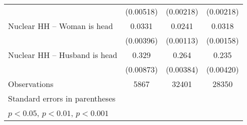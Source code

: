 {\begin{tabular}{l*{3}{c}}
                    &   (0.00518)         &   (0.00218)         &   (0.00218)         \\
\addlinespace
Nuclear HH – Woman is head&      0.0331\sym{***}&      0.0241\sym{***}&      0.0318\sym{***}\\
                    &   (0.00396)         &   (0.00113)         &   (0.00158)         \\
\addlinespace
Nuclear HH – Husband is head&       0.329\sym{***}&       0.264\sym{***}&       0.235\sym{***}\\
                    &   (0.00873)         &   (0.00384)         &   (0.00420)         \\
\midrule
Observations        &        5867         &       32401         &       28350         \\
\bottomrule
\multicolumn{4}{l}{\footnotesize Standard errors in parentheses}\\
\multicolumn{4}{l}{\footnotesize \sym{*} \(p<0.05\), \sym{**} \(p<0.01\), \sym{***} \(p<0.001\)}\\
\end{tabular}
}
